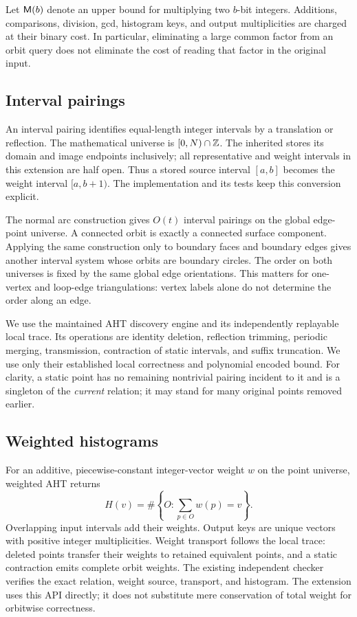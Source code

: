 Let $\mathsf M(b)$ denote an upper bound for multiplying two $b$-bit integers.
Additions, comparisons, division, gcd, histogram keys, and output multiplicities
are charged at their binary cost. In particular, eliminating a large common
factor from an orbit query does not eliminate the cost of reading that factor
in the original input.

\subsection{Interval pairings}

An interval pairing identifies equal-length integer intervals by a translation
or reflection. The mathematical universe is $[0,N)\cap\mathbb Z$. The inherited
 stores its domain and image endpoints inclusively;
all representative and weight intervals in this extension are half open.
Thus a stored source interval $[a,b]$ becomes the weight interval $[a,b+1)$.
The implementation and its tests keep this conversion explicit.

The normal arc construction gives $O(t)$ interval pairings on the global
edge-point universe. A connected orbit is exactly a connected surface
component. Applying the same construction only to boundary faces and boundary
edges gives another interval system whose orbits are boundary circles.
The order on both universes is fixed by the same global edge orientations.
This matters for one-vertex and loop-edge triangulations: vertex labels alone
do not determine the order along an edge.

We use the maintained AHT discovery engine and its independently replayable
local trace. Its operations are identity deletion, reflection trimming,
periodic merging, transmission, contraction of static intervals, and suffix
truncation. We use only their established local correctness and polynomial
encoded bound. For clarity, a static point has no remaining nontrivial pairing
incident to it and is a singleton of the \emph{current} relation; it may stand
for many original points removed earlier.

\subsection{Weighted histograms}

For an additive, piecewise-constant integer-vector weight $w$ on the point
universe, weighted AHT returns
\[
 H(v)=\#\left\{O:\sum_{p\in O}w(p)=v\right\}.
\]
Overlapping input intervals add their weights. Output keys are unique vectors
with positive integer multiplicities. Weight transport follows the local trace:
deleted points transfer their weights to retained equivalent points, and a
static contraction emits complete orbit weights. The existing independent
checker verifies the exact relation, weight source, transport, and histogram.
The extension uses this API directly; it does not substitute mere conservation
of total weight for orbitwise correctness.

